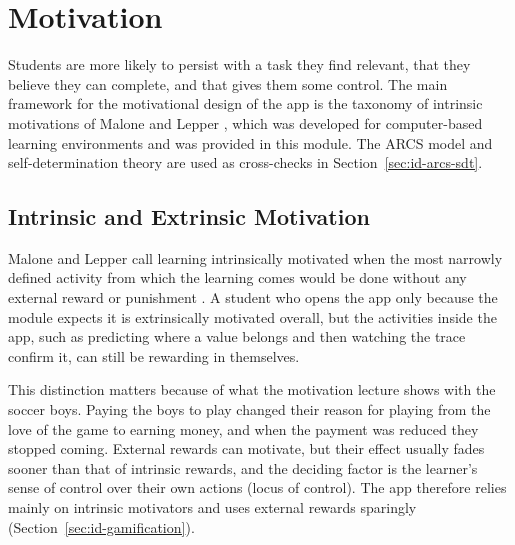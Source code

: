 \section{Motivation}\label{sec:id-motivation}

Students are more likely to persist with a task they find relevant, that they believe they can complete, and that gives them some control. The main framework for the motivational design of the app is the taxonomy of intrinsic motivations of Malone and Lepper \cite{Malone1987}, which was developed for computer-based learning environments and was provided in this module. The ARCS model \cite{Keller2010} and self-determination theory \cite{Deci2000} are used as cross-checks in Section~\ref{sec:id-arcs-sdt}.

\subsection{Intrinsic and Extrinsic Motivation}
Malone and Lepper call learning intrinsically motivated when the most narrowly defined activity from which the learning comes would be done without any external reward or punishment \cite[p.~229]{Malone1987}. A student who opens the app only because the module expects it is extrinsically motivated overall, but the activities inside the app, such as predicting where a value belongs and then watching the trace confirm it, can still be rewarding in themselves.

This distinction matters because of what the motivation lecture \cite{Marshall2026Motivation} shows with the soccer boys. Paying the boys to play changed their reason for playing from the love of the game to earning money, and when the payment was reduced they stopped coming. External rewards can motivate, but their effect usually fades sooner than that of intrinsic rewards, and the deciding factor is the learner's sense of control over their own actions (locus of control). The app therefore relies mainly on intrinsic motivators and uses external rewards sparingly (Section~\ref{sec:id-gamification}).

